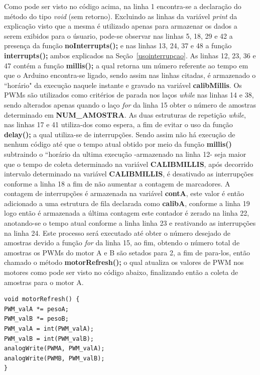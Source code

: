 \documentclass[a4paper,12pt,portuguese]{ufms-cpcx}
\begin{document}
Como pode ser visto no código acima, na linha 1 encontra-se a declaração do método do tipo \textit{void} (sem retorno). Excluindo as linhas da variável \textit{print} da explicação visto que a mesma é utilizado apenas para armazenar os dados a serem exibidos para o úsuario, pode-se observar nas linhas 5, 18, 29 e 42 a presença da função \textbf{noInterrupts();} e nas linhas 13, 24, 37 e 48 a função \textbf{interrupts();} ambos explicados na Seção~\ref{usointerrupcao}. 
As linhas 12, 23, 36 e 47 contém a função \textbf{millis();} a qual retorna um número referente ao tempo em que o Arduino encontra-se ligado, sendo assim nas linhas citadas, é armazenado o ``horário" da execução naquele instante e gravado na variável \textbf{calibMillis}.
Os PWMs são utilizados como critérios de parada nos laços \textit{while} nas linhas 14 e 38, sendo alterados apenas quando o laço \textit{for} da linha 15 obter o número de amostras determinado em \textbf{NUM\_AMOSTRA}.
As duas estruturas de repetição \textit{while}, nas linhas 17 e 41 utiliza-dos como espera, a fim de evitar o uso da função \textbf{delay();} a qual utiliza-se de interrupções.
Sendo assim não há execução de nenhum código até que o tempo atual obtido por meio da função \textbf{millis()} subtraindo o ``horário da ultima execução -armazenado na linha 12- seja maior que o tempo de coleta determinado na variável \textbf{CALIBMILLIS}, após decorrido intervalo determinado na variável \textbf{CALIBMILLIS}, é desativado as interrupções conforme a linha 18 a fim de não aumentar a contagem de marcadores.
A contagem de interrupções é armazenada na variável \textbf{contA}, este valor é então adicionado a uma estrutura de fila declarada como \textbf{calibA}, conforme a linha 19 logo então é armazenada a última contagem este contador é zerado na linha 22, anotando-se o tempo atual conforme a linha linha 23 e reativando as interrupções na linha 24.
Este processo será executado até obter o número desejado de amostras devido a função \textit{for} da linha 15, ao fim, obtendo o número total de amostras os PWMs do motor A e B são setados para 2, a fim de para-los, então chamado o método \textbf{motorRefresh();} o qual atualiza os valores de PWM nos motores como pode ser visto no código abaixo, finalizando então a coleta de amostras para o motor A.

\begin{lstlisting}
void motorRefresh() {
PWM_valA *= pesoA;
PWM_valB *= pesoB;
PWM_valA = int(PWM_valA);
PWM_valB = int(PWM_valB);
analogWrite(PWMA, PWM_valA);
analogWrite(PWMB, PWM_valB);
}
\end{lstlisting}
\end{document}
